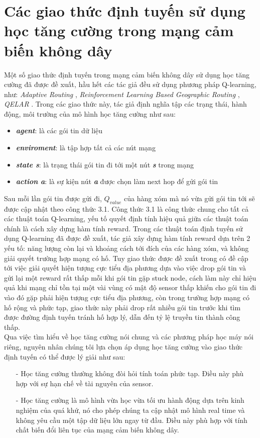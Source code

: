 \documentclass[12pt]{report}
\begin{document}
\section{Các giao thức định tuyến sử dụng học tăng cường trong mạng cảm biến không dây}
\label{sec:3.4}
Một số giao thức định tuyến trong mạng cảm biến không dây sử dụng học tăng cường đã được đề xuất, hầu hết các tác giả đều sử dụng phương pháp Q-learning, như: \textit{Adaptive Routing} \cite{adaptiveqlearning},  \textit{Reinforcement Learning Based Geographic Routing} \cite{qlearningwsn}, \textit{QELAR} \cite{qelar}. Trong các giao thức này, tác giả định nghĩa tập các trạng thái, hành động, môi trường của mô hình học tăng cường như sau:
\begin{itemize}
\item \textbf{\textit{agent}}: là các gói tin dữ liệu
\item \textbf{\textit{enviroment}}: là tập hợp tất cả các nút mạng
\item \textbf{\textit{state s}}: là trạng thái gói tin đi tới một nút \textbf{\textit{s}} trong mạng
\item \textbf{\textit{action a}}: là sự kiện nút \textit{\textbf{a}} được chọn làm next hop để gửi gói tin
\end{itemize} 
Sau mỗi lần gói tin được gửi đi, $Q_{value}$ của hàng xóm mà nó vừa gửi gói tin tới sẽ được cập nhật theo công thức 3.1. Công thức 3.1 là công thức chung cho tất cả các thuật toán Q-learning, yếu tố quyết định tính hiệu quả giữa các thuật toán chính là cách xây dựng hàm tính reward. Trong các thuật toán định tuyến sử dụng Q-learning đã được đề xuất, tác giả xây dựng hàm tính reward dựa trên 2 yếu tố: năng lượng còn lại và khoảng cách tới đích của các hàng xóm, và không giải quyết trường hợp mạng có hố. Tuy giao thức được đề xuất trong \cite{qlearningwsn} có đề cập tới việc giải quyết hiện tượng cực tiểu địa phương dựa vào việc drop gói tin và gửi lại một reward rất thấp mỗi khi gói tin gặp stuck node, cách làm này chỉ hiệu quả khi mạng chỉ tồn tại một vài vùng có mật độ sensor thấp khiến cho gói tin đi vào đó gặp phải hiện tượng cực tiểu địa phương, còn trong trường hợp mạng có hố rộng và phức tạp, giao thức này phải drop rất nhiều gói tin trước khi tìm được đường định tuyến tránh hố hợp lý, dẫn đến tỷ lệ truyền tin thành công thấp.\\
Qua việc tìm hiểu về học tăng cường nói chung và các phương pháp học máy nói riêng, nguyên nhân chúng tôi lựa chọn áp dụng học tăng cường vào giao thức định tuyến có thể được lý giải như sau:
\begin{itemize}
\item[-] Học tăng cường thường không đòi hỏi tính toán phức tạp. Điều này phù hợp với sự hạn chế về tài nguyên của sensor. 
\item[-] Học tăng cường là mô hình vừa học vừa tối ưu hành động dựa trên kinh nghiệm của quá khứ, nó cho phép chúng ta cập nhật mô hình real time và không yêu cầu một tập dữ liệu lớn ngay từ đầu. Điều này phù hợp với tính chất biến đổi liên tục của mạng cảm biến không dây.
\end{itemize}
\end{document}
